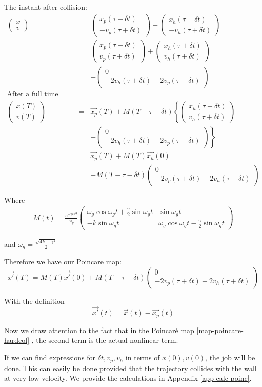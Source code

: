 \documentclass{book}
\renewcommand{\(}{\begin{columns}}
\renewcommand{\)}{\end{columns}}
\newcommand{\<}[1]{\begin{column}{#1}}
\renewcommand{\>}{\end{column}}
\newcommand{\colv}[2]{\begin{pmatrix}#1\\#2\end{pmatrix}}
\begin{document}
The instant after collision:\\
\begin{eqnarray*}
\colv{x}{v}&=&\colv{x_p(\tau+\delta t)}{-v_p(\tau+\delta t)}+\colv{x_h(\tau+\delta t)}{-v_h(\tau+\delta t)}\\
&=&\colv{x_p(\tau+\delta t)}{v_p(\tau+\delta t)}+\colv{x_h(\tau+\delta t)}{v_h(\tau+\delta t)}\\
& &+\colv{0}{-2v_h(\tau+\delta t)-2v_p(\tau+\delta t)} \\
\text{After a full time period T:}&&\\
\colv{x(T)}{v(T)}
&=&\vec{x_p}(T)+M(T-\tau-\delta t)\left\{\colv{x_h(\tau+\delta t)}{v_h(\tau+\delta t)}\right.\\
& &\left.+\colv{0}{-2v_h(\tau+\delta t)-2v_p(\tau+\delta t)}\right\}\\
&=&\vec{x_p}(T)+M(T)\vec{x_h}(0)\\&&+M(T-\tau-\delta t)\colv{0}{-2v_p(\tau+\delta t)-2v_h(\tau+\delta t)}
\end{eqnarray*}

Where 
\begin{eqnarray}
\label{def-huge-M-matrix}
M(t)=\frac{e^{-\gamma t/2}}{\omega_g}
\begin{pmatrix}
\omega_g\cos{\omega_g t}+\frac{\gamma}{2}\sin{\omega_g t} & \sin{\omega_g t}\\
-k\sin{\omega_g t} & \omega_g\cos{\omega_g t}-\frac{\gamma}{2}\sin{\omega_g t}
\end{pmatrix}
\end{eqnarray}

and
$\omega_g=\frac{\sqrt{4k-\gamma^2}}{2}$
 
Therefore we have our Poincare map:
\begin{equation}
\label{map-poincare-hardcol}
\vec{x'}(T)=M(T)\vec{x'}(0)+M(T-\tau-\delta t)\colv{0}{-2v_p(\tau+\delta t)-2v_h(\tau+\delta t)}
\end{equation}

With the definition
\[
\vec{x'}(t)=\vec{x}(t)-\vec{x_p}(t)
\]

Now we draw attention to the fact that in the Poincaré map 
\eqref{map-poincare-hardcol} , the second term is the actual nonlinear term.  

If we can find expressions for $\delta t, v_p, v_h$ in terms of $x(0),v(0)$, 
the job will be done.  This can easily be done provided that the trajectory 
collides with the wall at very low velocity.  We provide the calculations in 
Appendix \ref{app-calc-poinc}.
 
\end{document}
